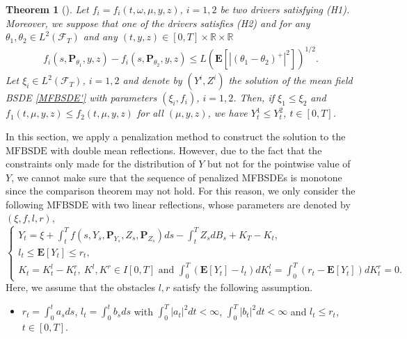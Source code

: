 \documentclass[10pt]{article}%
\numberwithin{equation}{section}
\newtheorem{theorem}{Theorem}[section]
\def \E{\mathbf{E}}
\def \P{\mathbf{P}}
\begin{document}
\begin{theorem}[\cite{LLZ}]\label{comparison for MFBSDE}
Let $f_i=f_i(t,\omega,\mu,y,z)$, $i=1,2$ be two drivers satisfying (H1). Moreover, we suppose that one of the drivers satisfies (H2) and for any $\theta_1,\theta_2\in L^2(\mathcal{F}_T)$ and any $(t,y,z)\in[0,T]\times \mathbb{R}\times\mathbb{R}$
\begin{align*}
f_i(s,\P_{\theta_1},y,z)-f_i(s,\P_{\theta_2},y,z)\leq L(\E[|(\theta_1-\theta_2)^+|^2])^{1/2}.
\end{align*}
Let $\xi_i\in L^2(\mathcal{F}_T)$, $i=1,2$ and denote by $(Y^i,Z^i)$ the solution of the mean field BSDE \eqref{MFBSDE'} with parameters $(\xi_i,f_i)$, $i=1,2$. Then, if $\xi_1\leq \xi_2$ and $f_1(t,\mu,y,z)\leq f_2(t,\mu,y,z)$ for all $(\mu,y,z)$, we have $Y^1_t\leq Y^2_t$, $t\in[0,T]$.
\end{theorem}
\fi


In this section, we apply a penalization method to construct the solution to the $\text{MFBSDE}$ with double mean reflections. However, due to the fact that the constraints only made for the distribution of $Y$ but not for the pointwise value of $Y$, we cannot make sure that the sequence of penalized MFBSDEs is monotone since the comparison theorem may not hold. For this reason, we only consider the following $\text{MFBSDE}$ with two linear reflections, whose parameters are denoted by $(\xi,f,l,r)$,
\begin{equation}\label{linearcase}
\begin{cases}
Y_t=\xi+\int_t^T f\left(s,Y_s,\P_{Y_s},Z_s,\P_{Z_s}\right)ds-\int_t^T Z_s dB_s+K_T-K_t, \\
l_t\leq \E\left[Y_t\right]\leq r_t, \\
K_t=K^l_t-K^r_t, \ K^l,K^r\in I[0,T]\textrm{ and } \int_0^T \left(\E[Y_t]-l_t\right)dK_t^l=\int_0^T \left(r_t-\E[Y_t]\right)dK^r_t=0.
\end{cases}
\end{equation}
Here, we assume that the obstacles $l,r$ satisfy the following assumption.

\begin{itemize}
\item[($H_{rl}$)] $r_t=\int_0^t a_s ds$, $l_t=\int_0^t b_s ds$ with $\int_0^T|a_t|^2 dt <\infty$, $\int_0^T|b_t|^2 dt<\infty$ and $l_t\leq r_t$, $t\in[0,T]$.
\end{itemize}
\end{document}
